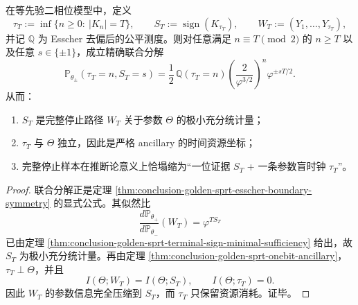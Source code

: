 \begin{theorem}[停止样本的精确二因子分解与一位充分化]\label{thm:conclusion-endpoint-stopping-onebit-ancillary-factorization}
在等先验二相位模型中，定义
\[
\tau_T:=\inf\{n\ge 0:\ |K_n|=T\},
\qquad
S_T:=\operatorname{sign}(K_{\tau_T}),
\qquad
W_T:=(Y_1,\dots,Y_{\tau_T}),
\]
并记 \(\mathbb Q\) 为 Esscher 去偏后的公平测度。则对任意满足 \(n\equiv T\pmod 2\) 的 \(n\ge T\) 以及任意 \(s\in\{\pm1\}\)，成立精确联合分解
\[
\mathbb P_{\theta_\pm}(\tau_T=n,S_T=s)
=
\frac12\,\mathbb Q(\tau_T=n)
\left(\frac{2}{\varphi^{3/2}}\right)^n
\varphi^{\pm sT/2}.
\]
从而：
\begin{enumerate}
  \item \(S_T\) 是完整停止路径 \(W_T\) 关于参数 \(\Theta\) 的极小充分统计量；
  \item \(\tau_T\) 与 \(\Theta\) 独立，因此是严格 ancillary 的时间资源坐标；
  \item 完整停止样本在推断论意义上恰塌缩为“一位证据 \(S_T\) + 一条参数盲时钟 \(\tau_T\)”。
\end{enumerate}
\end{theorem}
\begin{proof}
联合分解正是定理 \ref{thm:conclusion-golden-sprt-esscher-boundary-symmetry} 的显式公式。其似然比
\[
\frac{d\mathbb P_{\theta_+}}{d\mathbb P_{\theta_-}}(W_T)=\varphi^{TS_T}
\]
已由定理 \ref{thm:conclusion-golden-sprt-terminal-sign-minimal-sufficiency} 给出，故 \(S_T\) 为极小充分统计量。再由定理 \ref{thm:conclusion-golden-sprt-onebit-ancillary}，\(\tau_T\perp \Theta\)，并且
\[
I(\Theta;W_T)=I(\Theta;S_T),
\qquad
I(\Theta;\tau_T)=0.
\]
因此 \(W_T\) 的参数信息完全压缩到 \(S_T\)，而 \(\tau_T\) 只保留资源消耗。证毕。
\end{proof}

